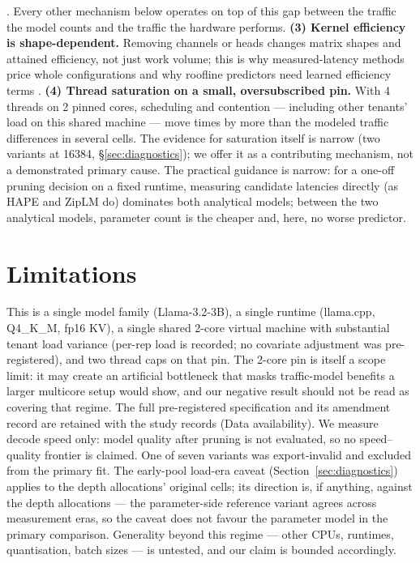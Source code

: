 \documentclass[11pt]{article}
\begin{document}
\citep{hape2025}. Every other mechanism below operates on top of
this gap between the traffic the model counts and the traffic
the hardware performs.
\textbf{(3) Kernel efficiency is shape-dependent.} Removing
channels or heads changes matrix shapes and attained efficiency,
not just work volume; this is why measured-latency methods price
whole configurations \citep{ziplm2023} and why roofline predictors
need learned efficiency terms \citep{kernelsight2026}.
\textbf{(4) Thread saturation on a small, oversubscribed pin.}
With 4 threads on 2 pinned cores, scheduling and contention ---
including other tenants' load on this shared machine --- move
times by more than the modeled traffic differences in several
cells. The evidence for saturation itself is narrow (two variants
at 16384, \S\ref{sec:diagnostics}); we offer it as a contributing
mechanism, not a demonstrated primary cause.
The practical guidance is narrow: for a one-off pruning decision
on a fixed runtime, measuring candidate latencies directly (as
HAPE and ZipLM do) dominates both analytical models; between the
two analytical models, parameter count is the cheaper and, here,
no worse predictor.

\section{Limitations}
\label{sec:limitations}
This is a single model family (Llama-3.2-3B), a single runtime
(llama.cpp, Q4\_K\_M, fp16 KV), a single shared 2-core virtual
machine with substantial tenant load variance (per-rep load is
recorded; no covariate adjustment was pre-registered), and two
thread caps on that pin. The 2-core pin is itself a scope limit:
it may create an artificial bottleneck that masks traffic-model
benefits a larger multicore setup would show, and our negative
result should not be read as covering that regime. The full
pre-registered specification and its amendment record are
retained with the study records (Data availability). We measure decode speed only: model
quality after pruning is not evaluated, so no speed--quality
frontier is claimed. One of seven variants was export-invalid and
excluded from the primary fit. The early-pool load-era caveat
(Section~\ref{sec:diagnostics}) applies to the depth allocations' original cells;
its direction is, if anything, against the depth allocations ---
the parameter-side reference variant agrees across measurement
eras, so the caveat does not favour the parameter model in the
primary comparison.
Generality beyond this regime --- other CPUs, runtimes,
quantisation, batch sizes --- is untested, and our claim is
bounded accordingly.
\end{document}
